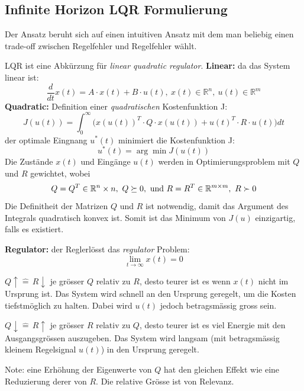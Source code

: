 \subsection{Infinite Horizon LQR Formulierung}
    Der Ansatz beruht sich auf einen intuitiven Ansatz mit dem man beliebig einen trade-off zwischen Regelfehler und Regelfehler wählt. 
    
    LQR ist eine Abkürzung für \textit{linear quadratic regulator}. 
    \textbf{Linear:} da das System linear ist:
    \[\frac{d}{dt}x(t) = A\cdot x(t) + B\cdot u(t),\ x(t) \in \mathbb{R}^n,\ u(t) \in \mathbb{R}^m\]
    \textbf{Quadratic:} Definition einer  \textit{quadratischen} Kostenfunktion J:
    \[J(u(t)) = \int_0^\infty\Big(x(u(t))^T\cdot Q\cdot x(u(t)) + u(t)^T \cdot R \cdot u(t)\Big)dt\]
    der optimale Eingnang $u^*(t)$ minimiert die Kostenfunktion J:
     \[u^*(t) = \arg\min J(u(t))\]
     Die Zustände $x(t)$ und Eingänge $u(t)$ werden in Optimierungsproblem mit $Q$ und $R$ gewichtet, wobei 
     \[Q=Q^T \in \mathbb{R}^n\times n,\ Q \succeq 0,\ \textnormal{und}\ R = R^T \in \mathbb{R}^{m\times m},\ R\succ 0\]
     Die Definitheit der Matrizen $Q$ und $R$ ist notwendig, damit das Argument des Integrals quadratisch konvex ist.
     Somit ist das Minimum von $J(u)$ einzigartig, falls es existiert.
    
    \textbf{Regulator:}
    der Reglerlösst das \textit{regulator} Problem:
    \[\lim\limits_{t \to \infty}x(t)=0\]
    
    
    $\boxed{Q\uparrow \widehat{=}\, R \downarrow}$ je grösser $Q$ relativ zu $R$, desto teurer ist es wenn $x(t)$ nicht im Ursprung ist. Das System wird schnell an den Ursprung geregelt, um die Kosten tiefstmöglich zu halten. Dabei wird $u(t)$ jedoch betragsmässig gross sein.
    
    $\boxed{Q\downarrow \widehat{=}\, R \uparrow}$ je grösser $R$ relativ zu $Q$, desto teurer ist es viel Energie mit den Ausgangsgrössen auszugeben. Das System wird langsam (mit betragsmässig kleinem Regelsignal $u(t)$) in den Ursprung geregelt.
    
    Note: eine Erhöhung der Eigenwerte von $Q$ hat den gleichen Effekt wie eine Reduzierung derer von $R$. Die relative Grösse ist von Relevanz.
    

